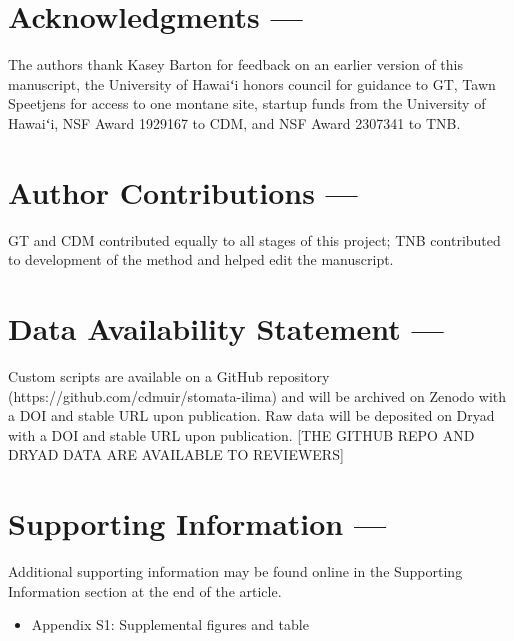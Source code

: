 \documentclass[
  letterpaper,
  DIV=11,
  numbers=noendperiod]{scrartcl}
\providecommand{\tightlist}{%
  \setlength{\itemsep}{0pt}\setlength{\parskip}{0pt}}\usepackage{longtable,booktabs,array}
\begin{document}
\hypertarget{acknowledgments}{%
\section{Acknowledgments ---}\label{acknowledgments}}

The authors thank Kasey Barton for feedback on an earlier version of
this manuscript, the University of Hawaiʻi honors council for guidance
to GT, Tawn Speetjens for access to one montane site, startup funds from
the University of Hawaiʻi, NSF Award 1929167 to CDM, and NSF Award
2307341 to TNB.

\hypertarget{author-ontributions}{%
\section{Author Contributions ---}\label{author-ontributions}}

GT and CDM contributed equally to all stages of this project; TNB
contributed to development of the method and helped edit the manuscript.

\hypertarget{data-availability-statement}{%
\section{Data Availability Statement
---}\label{data-availability-statement}}

Custom scripts are available on a GitHub repository
(https://github.com/cdmuir/stomata-ilima) and will be archived on Zenodo
with a DOI and stable URL upon publication. Raw data will be deposited
on Dryad with a DOI and stable URL upon publication. {[}THE GITHUB REPO
AND DRYAD DATA ARE AVAILABLE TO REVIEWERS{]}

\hypertarget{supporting-information}{%
\section{Supporting Information ---}\label{supporting-information}}

Additional supporting information may be found online in the Supporting
Information section at the end of the article.

\begin{itemize}
\tightlist
\item
  Appendix S1: Supplemental figures and table
\end{itemize}

\renewcommand\thefigure{S\arabic{figure}}    
\renewcommand\thetable{S\arabic{table}}    
\renewcommand\theequation{S\arabic{equation}}    
\setcounter{figure}{0}    
\setcounter{table}{0}    
\setcounter{equation}{0}
\end{document}
